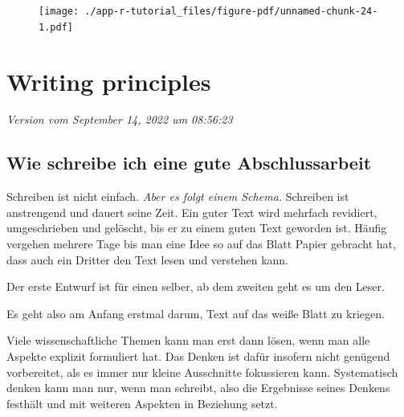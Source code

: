 \documentclass[
  letterpaper,
]{scrbook}
\begin{document}
\begin{figure}[H]

{\centering \texttt{[image: ./app-r-tutorial\_files/figure-pdf/unnamed-chunk-24-1.pdf]}

}

\end{figure}

\hypertarget{writing-principles}{%
\chapter{Writing principles}\label{writing-principles}}

\emph{Version vom September 14, 2022 um 08:56:23}

\hypertarget{wie-schreibe-ich-eine-gute-abschlussarbeit}{%
\section{Wie schreibe ich eine gute
Abschlussarbeit}\label{wie-schreibe-ich-eine-gute-abschlussarbeit}}

Schreiben ist nicht einfach. \emph{Aber es folgt einem Schema.}
Schreiben ist anstrengend und dauert seine Zeit. Ein guter Text wird
mehrfach revidiert, umgeschrieben und gelöscht, bis er zu einem guten
Text geworden ist. Häufig vergehen mehrere Tage bis man eine Idee so auf
das Blatt Papier gebracht hat, dass auch ein Dritter den Text lesen und
verstehen kann.

\begin{tcolorbox}[enhanced jigsaw, coltitle=black, titlerule=0mm, bottomrule=.15mm, opacityback=0, opacitybacktitle=0.6, leftrule=.75mm, title=\textcolor{quarto-callout-note-color}{\faInfo}\hspace{0.5em}{Zentraler Gedanke}, toprule=.15mm, bottomtitle=1mm, toptitle=1mm, left=2mm, breakable, arc=.35mm, colback=white, rightrule=.15mm, colbacktitle=quarto-callout-note-color!10!white, colframe=quarto-callout-note-color-frame]
Der erste Entwurf ist für einen selber, ab dem zweiten geht es um den
Leser.
\end{tcolorbox}

Es geht also am Anfang erstmal darum, Text auf das weiße Blatt zu
kriegen.

\begin{tcolorbox}[enhanced jigsaw, coltitle=black, titlerule=0mm, bottomrule=.15mm, opacityback=0, opacitybacktitle=0.6, leftrule=.75mm, title=\textcolor{quarto-callout-note-color}{\faInfo}\hspace{0.5em}{Otto Kruse -- Keine Angst vor dem leeren Blatt}, toprule=.15mm, bottomtitle=1mm, toptitle=1mm, left=2mm, breakable, arc=.35mm, colback=white, rightrule=.15mm, colbacktitle=quarto-callout-note-color!10!white, colframe=quarto-callout-note-color-frame]
Viele wissenschaftliche Themen kann man erst dann lösen, wenn man alle
Aspekte explizit formuliert hat. Das Denken ist dafür insofern nicht
genügend vorbereitet, als es immer nur kleine Ausschnitte fokussieren
kann. Systematisch denken kann man nur, wenn man schreibt, also die
Ergebnisse seines Denkens festhält und mit weiteren Aspekten in
Beziehung setzt.
\end{tcolorbox}
\end{document}
